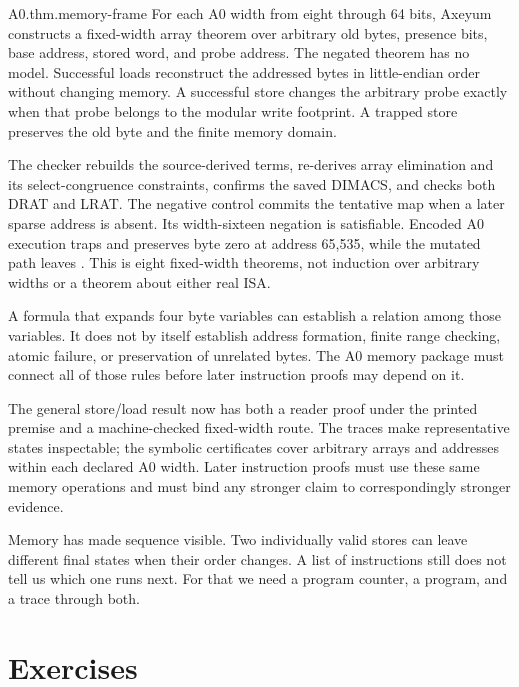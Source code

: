 \begin{artifact}{A0.thm.memory-frame}
For each A0 width from eight through 64 bits, Axeyum constructs a fixed-width
array theorem over arbitrary old bytes, presence bits, base address, stored
word, and probe address. The negated theorem has no model. Successful loads
reconstruct the addressed bytes in little-endian order without changing
memory. A successful store changes the arbitrary probe exactly when that probe
belongs to the modular write footprint. A trapped store preserves the old byte
and the finite memory domain.

The checker rebuilds the source-derived terms, re-derives array elimination and
its select-congruence constraints, confirms the saved DIMACS, and checks both
DRAT and LRAT. The negative control commits the tentative map when a later
sparse address is absent. Its width-sixteen negation is satisfiable. Encoded A0
execution traps and preserves byte zero at address 65,535, while the mutated
path leaves . This is eight fixed-width theorems, not induction over
arbitrary widths or a theorem about either real ISA.
\end{artifact}

\begin{sidebar}[title={Why a memory formula is not yet memory semantics}]
A formula that expands four byte variables can establish a relation among
those variables. It does not by itself establish address formation, finite
range checking, atomic failure, or preservation of unrelated bytes. The A0
memory package must connect all of those rules before later instruction proofs
may depend on it.
\end{sidebar}

The general store/load result now has both a reader proof under the printed
premise and a machine-checked fixed-width route. The traces make representative
states inspectable; the symbolic certificates cover arbitrary arrays and
addresses within each declared A0 width. Later instruction proofs must use
these same memory operations and must bind any stronger claim to
correspondingly stronger evidence.

Memory has made sequence visible. Two individually valid stores can leave
different final states when their order changes. A list of instructions still
does not tell us which one runs next. For that we need a program counter, a
program, and a trace through both.

\section{Exercises}

